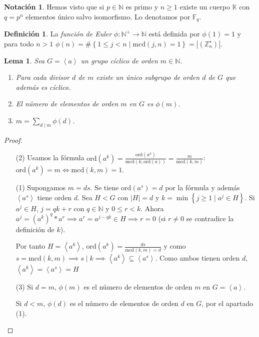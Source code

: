 \documentclass[10pt, spanish]{report}
\newtheorem{lema}[tma]{Lema}
\theoremstyle{definition}
\newtheorem*{defin}{Definición}
\newtheorem*{notacion}{Notación}
\newcommand{\N}{\mathbb{N}}
\newcommand{\Z}{\mathbb{Z}}
\newcommand{\F}{\mathbb{F}}
\newcommand{\K}{\mathbb{K}}
\newcommand{\ord}[1]{\text{ord}(#1)}
\newcommand{\mcd}[1]{\text{mcd}(#1)}
\renewcommand{\geq}{\geqslant}
\renewcommand{\leq}{\leqslant}
\newcommand{\fecha}[1]{\marginpar{\underline{\footnotesize{#1}}}}
\begin{document}
\fecha{16/03} %

\begin{notacion}
    Hemos visto que si $p\in\N$  es primo y $n\geq1$ existe un cuerpo $\K$ con
    $q=p^n$ elementos único salvo isomorfismo. Lo denotamos por $\F_q$.
\end{notacion}

\begin{defin}
    La \textit{función de Euler} $\phi:\N^+\to\N$ está definida por $\phi(1)=1$
    y para todo $n>1$ $\phi(n)=\#\left\{1\leq j<n\mid \mcd{j,n}=1\right\}=
    \left| \left( \Z_n^\star \right)\right|$.
\end{defin}

\begin{lema}\label{lema:propsgruposciclicos}
    Sea $G=\left< a \right> $  un grupo cíclico de orden $m\in\N$.
    \begin{enumerate}
        \item  Para cada divisor $d$ de $m$ existe un único subgrupo de orden
            $d$ de $G$ que además es cíclico.
        \item El número de elementos de orden $m$ en $G$ es $\phi(m)$.
        \item $m=\sum_{d\mid m}\phi(d)$.
    \end{enumerate}
\end{lema}

\begin{proof}\hspace{0pt}
    \begin{enumerate}
        \item[(2)] Usamos la fórmula
            $\ord{a^k}=\frac{\ord{a^k}}{\mcd{k,\ord{a}}}=
            \frac{m}{\mcd{k,m}}$: $\ord{a^k}=m\Leftrightarrow\mcd{k,m}=1$.
            \item[(1)] Supongamos $m=ds$. Se tiene $\ord{a^s}=d$ por la fórmula
                y además $\left< a^s \right> $ tiene orden $d$.
                Sea $H<G$ con $\left|H\right|=d$ y $k=\min\left\{ j\geq1\mid
                a^j\in H \right\}$. Si $a^j\in H$, $j=qk+r$ con $q\in\N$ y
                $0\leq r<k$. Ahora $a^j=(a^k)^q*a^r\implies a^r=a^{j-qk}\in
                H\implies r=0$ (si $r\neq0$ se contradice la definición de
                $k$).

                Por tanto $H= \left< a^k \right>$,
                $\ord{a^k}=\frac{ds}{\mcd{k,m}=d}$ y como $s=\mcd{k,m}\implies
                s\mid k\implies \left<a^k\right>\subseteq \left< a^s\right>$.
                Como ambos tienen orden $d$, $\left<a^k\right>=\left<a^s\right> =H$
            \item[(3)] Si $d=m$, $\phi(m)$ es el número de elementos de orden
                $m$ en $G=\left<a\right>$.

                Si $d<m$, $\phi(d)$ es el número de elementos de orden $d$ en
                $G$, por el apartado (1).
    \end{enumerate}
    \vspace{-1.75em}
\end{proof}
\end{document}
